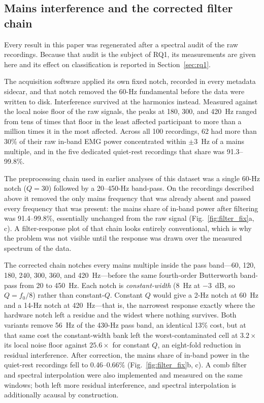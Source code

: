 \documentclass[pdflatex,sn-nature,iicol]{sn-jnl}
\begin{document}
\subsection{Mains interference and the corrected filter chain}
\label{sec:filter}

Every result in this paper was regenerated after a spectral audit of the raw recordings. Because that audit is the subject of RQ1, its measurements are given here and its effect on classification is reported in Section~\ref{sec:rq1}.

The acquisition software applied its own fixed notch, recorded in every metadata sidecar, and that notch removed the 60-Hz fundamental before the data were written to disk. Interference survived at the harmonics instead. Measured against the local noise floor of the raw signals, the peaks at 180, 300, and 420~Hz ranged from tens of times that floor in the least affected participant to more than a million times it in the most affected. Across all 100 recordings, 62 had more than 30\% of their raw in-band EMG power concentrated within $\pm 3$~Hz of a mains multiple, and in the five dedicated quiet-rest recordings that share was 91.3--99.8\%.

The preprocessing chain used in earlier analyses of this dataset was a single 60-Hz notch ($Q=30$) followed by a 20--450-Hz band-pass. On the recordings described above it removed the only mains frequency that was already absent and passed every frequency that was present: the mains share of in-band power after filtering was 91.4--99.8\%, essentially unchanged from the raw signal (Fig.~\ref{fig:filter_fix}a, c). A filter-response plot of that chain looks entirely conventional, which is why the problem was not visible until the response was drawn over the measured spectrum of the data.

The corrected chain notches every mains multiple inside the pass band---60, 120, 180, 240, 300, 360, and 420~Hz---before the same fourth-order Butterworth band-pass from 20 to 450~Hz. Each notch is \emph{constant-width} (8~Hz at $-3$~dB, so $Q = f_0/8$) rather than constant-$Q$. Constant $Q$ would give a 2-Hz notch at 60~Hz and a 14-Hz notch at 420~Hz---that is, the narrowest response exactly where the hardware notch left a residue and the widest where nothing survives. Both variants remove 56~Hz of the 430-Hz pass band, an identical 13\% cost, but at that same cost the constant-width bank left the worst-contaminated cell at $3.2\times$ its local noise floor against $25.6\times$ for constant $Q$, an eight-fold reduction in residual interference. After correction, the mains share of in-band power in the quiet-rest recordings fell to 0.46--0.66\% (Fig.~\ref{fig:filter_fix}b, c). A comb filter and spectral interpolation were also implemented and measured on the same windows; both left more residual interference, and spectral interpolation is additionally acausal by construction.
\end{document}
